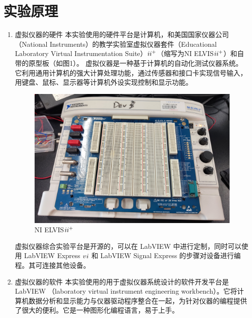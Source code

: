 \documentclass[UTF8]{article}
\begin{document}
\section{实验原理}
\begin{enumerate}
    \item 虚拟仪器的硬件
    \newline \hspace*{2em}本实验使用的硬件平台是计算机，和美国国家仪器公司（National Instruments）的教学实验室虚拟仪器套件（Educational Laboratory Virtual Instrumentation Suite）$\uppercase\expandafter{\romannumeral2}^+ $（缩写为NI ELVIS$\uppercase\expandafter{\romannumeral2}^+ $）和自带的原型板（如图1）。
    虚拟仪器是一种基于计算机的自动化测试仪器系统。它利用通用计算机的强大计算处理功能，通过传感器和接口卡实现信号输入，用键盘、鼠标、显示器等计算机外设实现控制和显示功能。
    \begin{figure}[h]
        \centering
        \includegraphics[width=13cm]{Fig/1.jpg}
        \caption{NI ELVIS$\uppercase\expandafter{\romannumeral2}^+$}
    \end{figure}
    \newline \hspace*{2em}虚拟仪器综合实验平台是开源的，可以在 LabVIEW 中进行定制，同时可以使用 LabVIEW Express $\uppercase\expandafter{\romannumeral6} $ 和 LabVIEW Signal Express 的步骤对设备进行编程。其可连接其他设备。
    \item 虚拟仪器的软件
    \newline \hspace*{2em}本实验使用的用于虚拟仪器系统设计的软件开发平台是LabVIEW （laboratory virtual instrument engineering workbench）。它将计算机数据分析和显示能力与仪器驱动程序整合在一起，为针对仪器的编程提供了很大的便利。它是一种图形化编程语言，易于上手。

\end{enumerate}
\end{document}
